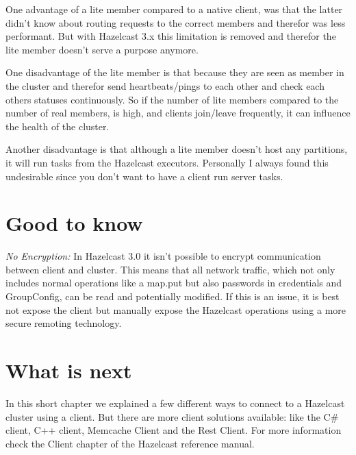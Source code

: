 One advantage of a lite member compared to a native client, was that the latter didn't know about routing requests to the correct members and therefor was less performant. But with Hazelcast 3.x this limitation is removed and therefor the lite member doesn't serve a purpose anymore.

One disadvantage of the lite member is that because they are seen as member in the cluster and therefor send heartbeats/pings to each other and check each others statuses continuously. So if the number of lite members compared to the number of real members, is high, and clients join/leave frequently, it can influence the health of the cluster. 

Another disadvantage is that although a lite member doesn't host any partitions, it will run tasks from the Hazelcast executors. Personally I always found this undesirable since you don't want to have a client run server tasks.

\section{Good to know}

\emph{No Encryption:} In Hazelcast 3.0 it isn't possible to encrypt communication between client and cluster. This means that all network traffic, which not only includes normal operations like a map.put but also passwords in credentials and GroupConfig, can be read and potentially modified. If this is an issue, it is best not expose the client but manually expose the Hazelcast operations using a more secure remoting technology. 

\section{What is next}
In this short chapter we explained a few different ways to connect to a Hazelcast cluster using a client. But there are more client solutions available: like the C\# client, C++ client, Memcache Client and the Rest Client. For more information check the Client chapter of the Hazelcast reference manual.
